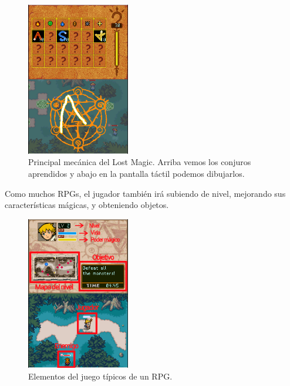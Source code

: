 \begin{figure}[htbp]
\centering
  \includegraphics[width=0.4\textwidth]{archivos/lostmagic2.png}
  \caption{Principal mecánica del Lost Magic. Arriba vemos los conjuros aprendidos y abajo en la pantalla táctil podemos dibujarlos.}
  \label{fig:lostmagic1}
\end{figure}

\vspace{0.5cm}

Como muchos RPGs, el jugador también irá subiendo de nivel, mejorando sus características mágicas, y obteniendo objetos.

\clearpage

\begin{figure}[htbp]
\centering
  \includegraphics[width=0.4\textwidth]{archivos/lostmagic1.png}
  \caption{Elementos del juego típicos de un RPG.}
  \label{fig:lostmagic2}
\end{figure}

\vspace{0.5cm}

